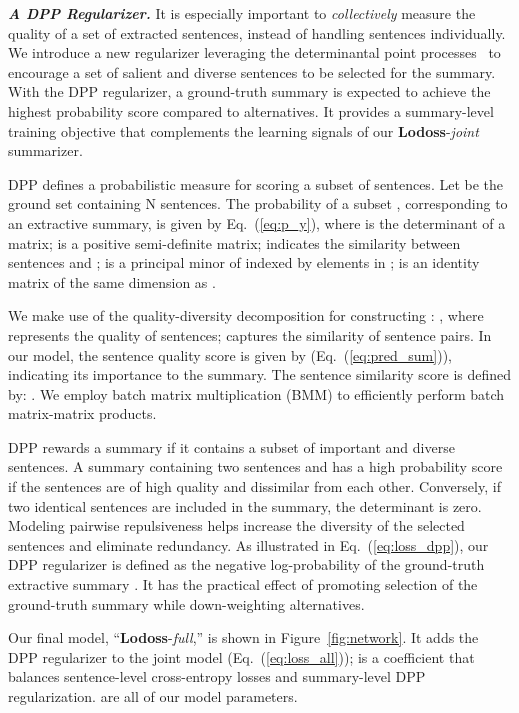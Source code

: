 \documentclass[11pt]{article}
\begin{document}
\noindent\textbf{\textsl{A DPP Regularizer.}}\quad
It is especially important to \emph{collectively} measure the quality of a set of extracted sentences, instead of handling sentences individually.
We introduce a new regularizer leveraging the determinantal point processes~\cite{Kulesza:2012,Zhang:2016:DPP,DPPAttn:2021}
to encourage a set of salient and diverse sentences to be selected for the summary.
With the DPP regularizer, a ground-truth summary  is expected to achieve the highest probability score compared to alternatives.
It provides a summary-level training objective that complements the learning signals of our \textbf{Lodoss}-\emph{joint} summarizer.


DPP defines a probabilistic measure for scoring a subset of sentences.
Let  be the ground set containing \textsf{N} sentences. 
The probability of a subset , corresponding to an extractive summary, is given by Eq.~(\ref{eq:p_y}),
where  is the determinant of a matrix;
 is a positive semi-definite matrix; 
 indicates the similarity between sentences  and ;
 is a principal minor of  indexed by elements in ;
 is an identity matrix of the same dimension as .



We make use of the quality-diversity decomposition for constructing :
,
where  represents the quality of sentences;
 captures the similarity of sentence pairs.
In our model, the sentence quality score  is given by  (Eq.~(\ref{eq:pred_sum})),
indicating its importance to the summary.
The sentence similarity score is defined by: 
.
We employ batch matrix multiplication (BMM) to efficiently perform batch matrix-matrix products.


DPP rewards a summary if it contains a subset of important and diverse sentences.
A summary containing two sentences  and  
has a high probability score  if the sentences are of high quality
and dissimilar from each other.
Conversely, if two identical sentences are included in the summary,
the determinant  is zero.
Modeling pairwise repulsiveness
helps increase the diversity of the selected sentences
and eliminate redundancy.
As illustrated in Eq.~(\ref{eq:loss_dpp}),
our DPP regularizer is defined as the negative log-probability of the ground-truth extractive summary .
It has the practical effect of promoting selection of the ground-truth summary 
while down-weighting alternatives. 



Our final model, ``\textbf{Lodoss}-\emph{full},'' is shown in Figure~\ref{fig:network}. 
It adds the DPP regularizer to the joint model (Eq.~(\ref{eq:loss_all}));
 is a coefficient that balances sentence-level cross-entropy losses and summary-level DPP regularization.
 are all of our model parameters.
\end{document}

